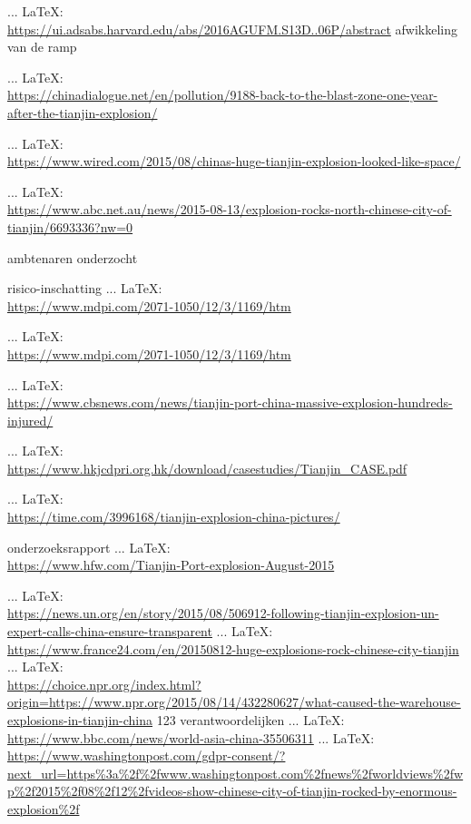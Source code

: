 \begin{thebibliography}{99}
{{{{     ... \LaTeX:\\ \url{https://ui.adsabs.harvard.edu/abs/2016AGUFM.S13D..06P/abstract}
    afwikkeling van de ramp

     ... \LaTeX:\\ \url{https://chinadialogue.net/en/pollution/9188-back-to-the-blast-zone-one-year-after-the-tianjin-explosion/}

     ... \LaTeX:\\ \url{https://www.wired.com/2015/08/chinas-huge-tianjin-explosion-looked-like-space/}

     ... \LaTeX:\\ \url{https://www.abc.net.au/news/2015-08-13/explosion-rocks-north-chinese-city-of-tianjin/6693336?nw=0}

    ambtenaren onderzocht
    
    risico-inschatting
     ... \LaTeX:\\ \url{https://www.mdpi.com/2071-1050/12/3/1169/htm}

     ... \LaTeX:\\ \url{https://www.mdpi.com/2071-1050/12/3/1169/htm}

     ... \LaTeX:\\ \url{https://www.cbsnews.com/news/tianjin-port-china-massive-explosion-hundreds-injured/}

     ... \LaTeX:\\ \url{https://www.hkjcdpri.org.hk/download/casestudies/Tianjin_CASE.pdf}

     ... \LaTeX:\\ \url{https://time.com/3996168/tianjin-explosion-china-pictures/}

    onderzoeksrapport
     ... \LaTeX:\\ \url{https://www.hfw.com/Tianjin-Port-explosion-August-2015}

     ... \LaTeX:\\ \url{https://news.un.org/en/story/2015/08/506912-following-tianjin-explosion-un-expert-calls-china-ensure-transparent}
     ... \LaTeX:\\ \url{https://www.france24.com/en/20150812-huge-explosions-rock-chinese-city-tianjin}
     ... \LaTeX:\\ \url{https://choice.npr.org/index.html?origin=https://www.npr.org/2015/08/14/432280627/what-caused-the-warehouse-explosions-in-tianjin-china}
    123 verantwoordelijken
     ... \LaTeX:\\ \url{https://www.bbc.com/news/world-asia-china-35506311}
     ... \LaTeX:\\ \url{https://www.washingtonpost.com/gdpr-consent/?next_url=https%3a%2f%2fwww.washingtonpost.com%2fnews%2fworldviews%2fwp%2f2015%2f08%2f12%2fvideos-show-chinese-city-of-tianjin-rocked-by-enormous-explosion%2f}

}}}}
\end{thebibliography}
